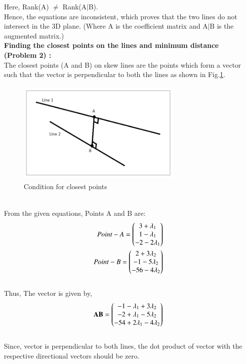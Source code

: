 \documentclass[journal,12pt,twocolumn]{IEEEtran}
\begin{document}
Here, Rank(A) $\neq$ Rank(A$\mid$B).
\\
Hence, the equations are inconsistent, which proves that the two lines do not intersect in the 3D plane. (Where A is the coefficient matrix and A$\mid$B is the augmented matrix.) \\
\newpage \noindent
\textbf{Finding the closest points on the lines and minimum distance (Problem 2) :}\\
The closest points (A and B) on skew lines are the points which form a vector such that the vector is perpendicular to both the lines as shown in Fig.\ref{Fig3}.
\\
\begin{figure}[h!]
\centering
\includegraphics[width=8cm, height=5cm]{Figure_3}
\caption{Condition for closest points}
\label{Fig3}
\end{figure}
\\
From the given equations, Points A and B are:
\\
\begin{align}
   Point-A = \begin{pmatrix}3+\lambda_1 \\ 1-\lambda_1 \\ -2-2\lambda_1\end{pmatrix} \label{34} \\ 
   Point-B= \begin{pmatrix}2+3\lambda_2 \\ -1-5\lambda_2 \\ -56-4\lambda_2\end{pmatrix} \label{35} 
\end{align}
\\
Thus, The vector  is given by,
\begin{align}
   \mathbf{AB}= \begin{pmatrix}-1-\lambda_1+3\lambda_2 \\ -2+\lambda_1-5\lambda_2\\ -54+2\lambda_1-4\lambda_2\end{pmatrix}
\end{align}
\\
Since, vector  is perpendicular to both lines, the dot product of vector  with the respective directional vectors should be zero. \\
\\
\end{document}
